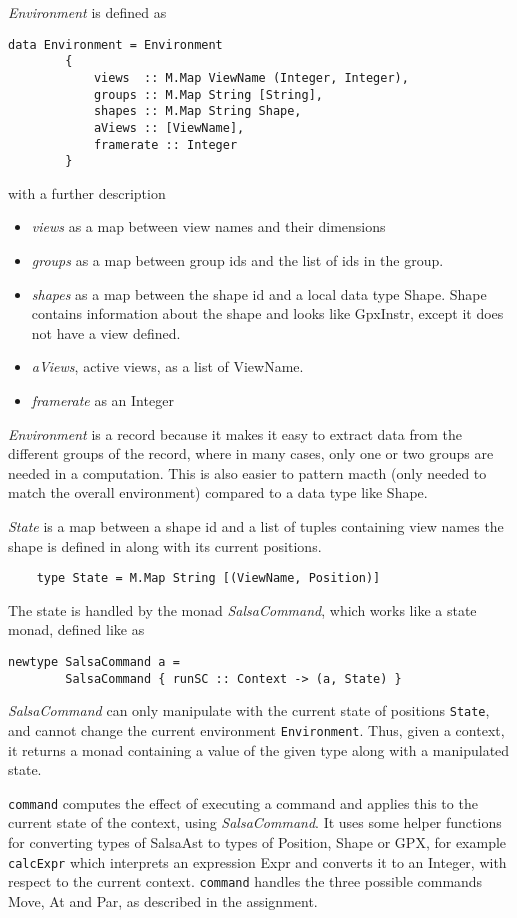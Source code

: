 \documentclass[a4paper, 10pt]{article}
\begin{document}
\textit{Environment} is defined as
\begin{verbatim}
data Environment = Environment 
        {
            views  :: M.Map ViewName (Integer, Integer),
            groups :: M.Map String [String],
            shapes :: M.Map String Shape,
            aViews :: [ViewName],
            framerate :: Integer
        }
\end{verbatim}
with a further description
\begin{itemize}
  \item \textit{views} as a map between view names and their dimensions
  \item \textit{groups} as a map between group ids and the list of ids in the group.
  \item \textit{shapes} as a map between the shape id and a local data type Shape. Shape contains information about the shape and looks like GpxInstr, except it does not have a view defined.
  \item \textit{aViews}, active views, as a list of ViewName.
  \item \textit{framerate} as an Integer
\end{itemize}
\textit{Environment} is a record because it makes it easy to extract data from the different groups of the record, where in many cases, only one or two groups are needed in a computation. This is also easier to pattern macth (only needed to match the overall environment) compared to a data type like Shape.

\textit{State} is a map between a shape id and a list of tuples containing view names the shape is defined in along with its current positions.
\begin{verbatim}
    type State = M.Map String [(ViewName, Position)]
\end{verbatim}

The state is handled by the monad \textit{SalsaCommand}, which works like a state monad, defined like as
\begin{verbatim}
newtype SalsaCommand a = 
        SalsaCommand { runSC :: Context -> (a, State) }
\end{verbatim}
\textit{SalsaCommand} can only manipulate with the current state of positions \texttt{State}, and cannot change the current environment \texttt{Environment}. Thus, given a context, it returns a monad containing a value of the given type along with a manipulated state.

\texttt{command} computes the effect of executing a command and applies this to the current state of the context, using \textit{SalsaCommand}. It uses some helper functions for converting types of SalsaAst to types of Position, Shape or GPX, for example \texttt{calcExpr} which interprets an expression Expr and converts it to an Integer, with respect to the current context. \texttt{command} handles the three possible commands Move, At and Par, as described in the assignment.
\end{document}
